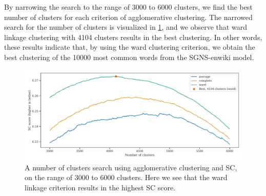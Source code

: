 By narrowing the search to the range of 3000 to 6000 clusters, we find the best number of clusters for each criterion of agglomerative clustering. The narrowed search for the number of clusters is visualized in \cref{fig:cluster-analysis-agglomerative-internal-cluster-validation-narrow}, and we observe that ward linkage clustering with 4104 clusters results in the best clustering. In other words, these results indicate that, by using the ward clustering criterion, we obtain the best clustering of the 10000 most common words from the SGNS-enwiki model.
\begin{figure}[H]
    \centering
    \includegraphics[width=\textwidth]{thesis/figures/cluster-analysis-agglomerative-internal-cluster-validation-narrow.pdf}
    \caption{A number of clusters search using agglomerative clustering and SC, on the range of 3000 to 6000 clusters. Here we see that the ward linkage criterion results in the highest SC score.}
    \label{fig:cluster-analysis-agglomerative-internal-cluster-validation-narrow}
\end{figure}

